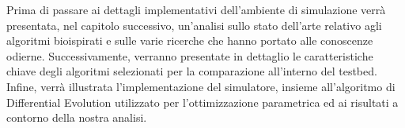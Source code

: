 Prima di passare ai dettagli implementativi dell’ambiente di simulazione verrà presentata, nel capitolo successivo, un’analisi sullo stato dell’arte relativo agli algoritmi bioispirati e sulle varie ricerche che hanno portato alle conoscenze odierne. 
Successivamente, verranno presentate in dettaglio le caratteristiche chiave degli algoritmi selezionati per la comparazione all’interno del testbed. 
Infine, verrà illustrata l’implementazione del simulatore, insieme all’algoritmo di Differential Evolution utilizzato per l’ottimizzazione parametrica ed ai risultati a contorno della nostra analisi.

